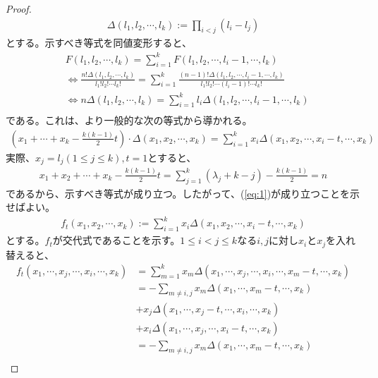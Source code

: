 \documentclass[a4paper,11pt]{jsarticle}
\theoremstyle{plain}
\theoremstyle{definition}
\renewcommand{\(}{\left(}
\renewcommand{\)}{\right)}
\renewcommand{\[}{\left[}
\renewcommand{\]}{\right]}
\renewcommand{\{}{\left\lbrace}
\renewcommand{\}}{\right\rbrace}
\newcommand{\Iff}{\Longleftrightarrow}
\begin{document}
\begin{proof}
    \begin{align*}
        \Delta(l_1, l_2, \cdots, l_k) := \prod_{i<j}(l_i-l_j)
    \end{align*}
    とする。示すべき等式を同値変形すると、
    \begin{align*}
        & F(l_1, l_2, \cdots, l_k) = \sum_{i=1}^{k} F(l_1, l_2, \cdots, l_i - 1, \cdots, l_k) \\
        &\Iff \frac{n! \Delta(l_1, l_2, \cdots, l_k)}{l_1! l_2! \cdots l_k!} = \sum_{i=1}^{k} \frac{(n-1)! \Delta(l_1, l_2, \cdots, l_i - 1, \cdots, l_k)}{l_1! l_2! \cdots (l_i-1)! \cdots l_k!} \\
        &\Iff n \Delta(l_1, l_2, \cdots, l_k) = \sum_{i=1}^{k} l_i \Delta(l_1, l_2, \cdots, l_i - 1, \cdots, l_k) \\
    \end{align*}
    である。これは、より一般的な次の等式から導かれる。
    \begin{align}
        \(x_1+\cdots+x_k-\frac{k(k-1)}{2}t\) \cdot \Delta(x_1, x_2, \cdots, x_k) = \sum_{i=1}^{k} x_i \Delta(x_1, x_2, \cdots, x_i - t, \cdots, x_k)  \label{eq:1}
    \end{align}
    実際、$x_j = l_j (1 \leq j \leq k), t = 1$とすると、
    \begin{align*}
        x_1 + x_2 + \cdots + x_k - \frac{k(k-1)}{2}t = \sum_{j=1}^{k} (\lambda_j + k - j) - \frac{k(k-1)}{2} = n
    \end{align*}
    であるから、示すべき等式が成り立つ。したがって、(\ref{eq:1})が成り立つことを示せばよい。
    \begin{align*}
        f_t(x_1, x_2, \cdots, x_k) := \sum_{i=1}^{k} x_i \Delta(x_1, x_2, \cdots, x_i - t, \cdots, x_k)
    \end{align*}
    とする。$f_t$が交代式であることを示す。$1 \leq i < j \leq k$なる$i,j$に対し$x_i$と$x_j$を入れ替えると、
    \begin{align*}
        f_t(x_1, \cdots,x_j ,\cdots, x_i,\cdots, x_k) &= \sum_{m=1}^{k} x_m \Delta(x_1, \cdots, x_j ,\cdots, x_i,\cdots, x_m - t,\cdots, x_k) \\
        &= -\sum_{m\neq i,j} x_m \Delta(x_1, \cdots, x_m - t,\cdots, x_k)  \\
        &+ x_j \Delta(x_1, \cdots, x_j - t,\cdots, x_i,\cdots, x_k) \\
        &+ x_i \Delta(x_1, \cdots, x_j,\cdots, x_i - t,\cdots, x_k) \\
        &= -\sum_{m\neq i,j} x_m \Delta(x_1, \cdots, x_m - t,\cdots, x_k)  \\

\end{align*}
\end{proof}
\end{document}

